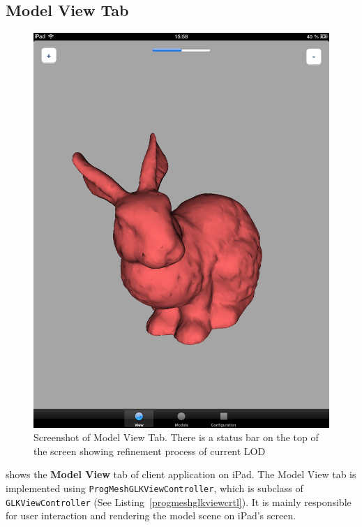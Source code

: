 \subsection{Model View Tab}
\label{section:modelview}
\begin{figure}
	\centering
	\includegraphics[width=1.0\textwidth]{images/ModelView.png}
	\caption{Screenshot of Model View Tab. There is a status bar on the top of the screen showing refinement process of current LOD}
	\label{fig:modelviewtab}
\end{figure}

 shows the \textbf{Model View} tab of client application on iPad. The Model View tab is implemented using 
\texttt{ProgMeshGLKViewController}, which is subclass of \texttt{GLKViewController} (See Listing~\ref{progmeshglkviewcrtl}). It is mainly responsible for user interaction and rendering the model scene on iPad's screen. 

